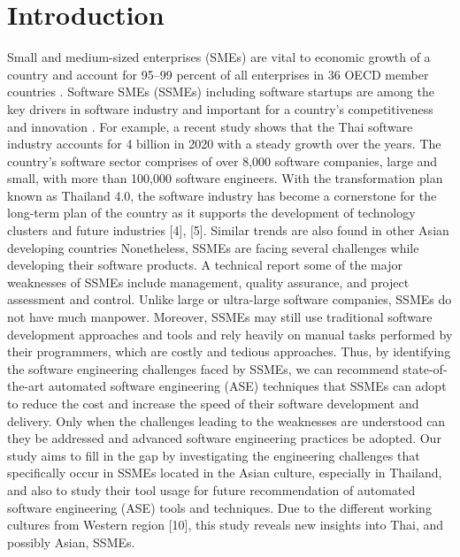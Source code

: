 \documentclass[conference]{IEEEtran}
\begin{document}
\section{Introduction}
Small and medium-sized enterprises (SMEs) are vital to
economic growth of a country and account for 95–99 percent of all enterprises in 36 OECD member countries . Software
SMEs (SSMEs) including software startups are among the
key drivers in software industry and important for a country’s
competitiveness and innovation . For example, a recent
study shows that the Thai software industry accounts for
4 billion in 2020 with a steady growth over the years. The
country’s software sector comprises of over 8,000 software
companies, large and small, with more than 100,000 software
engineers. With the transformation plan known as Thailand
4.0, the software industry has become a cornerstone for the
long-term plan of the country as it supports the development
of technology clusters and future industries [4], [5]. Similar
trends are also found in other Asian developing countries
Nonetheless, SSMEs are facing several challenges while
developing their software products. A technical report some of the major weaknesses of SSMEs include management, quality assurance, and project assessment
and control. Unlike large or ultra-large software companies,
SSMEs do not have much manpower. Moreover, SSMEs
may still use traditional software development approaches
and tools and rely heavily on manual tasks performed by
their programmers, which are costly and tedious approaches.
Thus, by identifying the software engineering challenges faced
by SSMEs, we can recommend state-of-the-art automated software engineering (ASE) techniques that SSMEs can adopt
to reduce the cost and increase the speed of their software
development and delivery. Only when the challenges leading
to the weaknesses are understood can they be addressed and
advanced software engineering practices be adopted.
Our study aims to fill in the gap by investigating the  engineering challenges that specifically occur in SSMEs
located in the Asian culture, especially in Thailand, and also to
study their tool usage for future recommendation of automated
software engineering (ASE) tools and techniques. Due to the
different working cultures from Western region [10], this study
reveals new insights into Thai, and possibly Asian, SSMEs.
\end{document}
